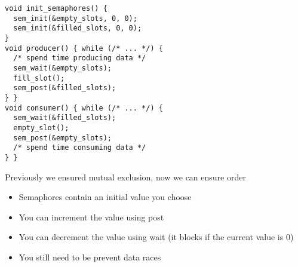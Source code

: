   \begin{slide}


    \begin{verbatim}
void init_semaphores() {
  sem_init(&empty_slots, 0, 0);
  sem_init(&filled_slots, 0, 0);
}
void producer() { while (/* ... */) {
  /* spend time producing data */
  sem_wait(&empty_slots);
  fill_slot();
  sem_post(&filled_slots);
} }
void consumer() { while (/* ... */) {
  sem_wait(&filled_slots);
  empty_slot();
  sem_post(&empty_slots);
  /* spend time consuming data */
} }
    \end{verbatim}

  \end{slide}

  \begin{slide}


    Previously we ensured mutual exclusion, now we can ensure order

    \begin{itemize}
      \item Semaphores contain an initial value you choose
      \item You can increment the value using post
      \item You can decrement the value using wait (it blocks if the current
            value is 0)
      \item You still need to be prevent data races
    \end{itemize}

  \end{slide}


